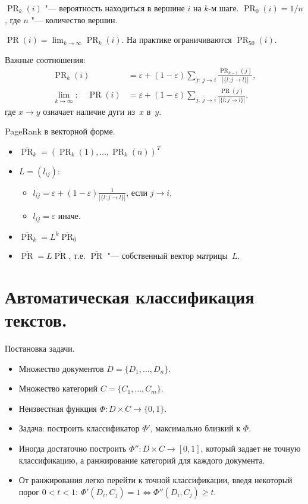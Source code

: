 \documentclass[a4paper,12pt]{article}
\renewcommand{\epsilon}{\varepsilon}
\newcommand{\PR}{\mathop{\mathrm{PR}}\nolimits}
\begin{document}
$\PR_k(i)$ "--- вероятность находиться в вершине $i$ на $k$-м шаге.
$\PR_0(i)=1/n$, где $n$ "--- количество вершин.

$\PR(i)=\lim_{k\to\infty}\PR_k(i)$.
На практике ограничиваются $\PR_{50}(i)$.

Важные соотношения:
\begin{align*}
\PR_k(i)&=\epsilon+(1-\epsilon)\sum_{j:\;j\to i}\frac{\PR_{k-1}(j)}{|\{l:j\to l\}|},\\
\lim_{k\to\infty}:\quad \PR(i)&=\epsilon+(1-\epsilon)\sum_{j:\;j\to i}\frac{\PR(j)}{|\{l:j\to l\}|},
\end{align*}
где $x\to y$ означает наличие дуги из~$x$ в~$y$.

PageRank в векторной форме.
\begin{itemize}
\item $\overline{\PR}_k=(\PR_k(1),\dots,\PR_k(n))^{T}$
\item $L=(l_{ij})$:
\begin{itemize}
\item $l_{ij}=\epsilon+(1-\epsilon)\frac{1}{|\{l:j\to l\}|}$, если $j\to i$,
\item $l_{ij}=\epsilon$ иначе.
\end{itemize}
\item $\overline{\PR}_k=L^k\overline{\PR}_0$
\item $\overline{\PR}=L\overline{\PR}$, т.е. $\overline{\PR}$ "---
собственный вектор матрицы~$L$.
\end{itemize}


\section{Автоматическая классификация текстов.}

Постановка задачи.
\begin{itemize}
\item Множество документов $D=\{D_1,\dots,D_n\}$.
\item Множество категорий $C=\{C_1,\dots,C_m\}$.
\item Неизвестная функция $\Phi:D\times C\to\{0,1\}$.
\item Задача: построить классификатор $\Phi'$, максимально близкий к $\Phi$.
\item Иногда достаточно построить $\Phi'':D\times C\to[0,1]$, который задает
не точную классификацию, а ранжирование категорий для каждого документа.
\item От ранжирования легко перейти к точной классификации, введя
некоторый порог $0<t<1$: $\Phi'(D_i,C_j)=1\iff \Phi''(D_i,C_j)\ge t$.
\end{itemize}
\end{document}
